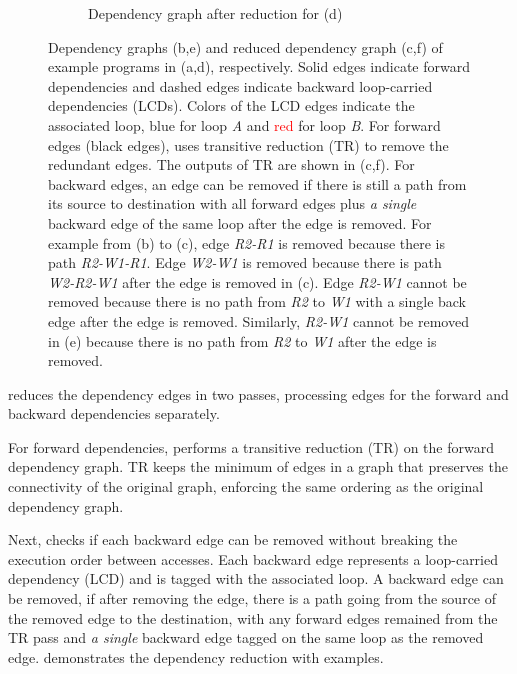 \begin{figure}
\begin{subfigure}[b]{0.3\textwidth}
\caption{
  Dependency graph after reduction for (d)
}
\end{subfigure}
\caption[Dependency graph reduction]{
  Dependency graphs (b,e) and reduced dependency graph (c,f) of example programs in (a,d),
  respectively.
  Solid edges indicate forward dependencies and
  dashed edges indicate backward loop-carried dependencies (LCDs).
  Colors of the LCD edges indicate the associated loop, \textcolor{pureblue}{blue} for loop \emph{A} and
  \textcolor{red}{red} for loop \emph{B}.
  For forward edges (black edges), \name uses transitive reduction (TR) to remove the redundant
  edges. The outputs of TR are shown in (c,f).
  For backward edges, an edge can be removed if there is still a path from its source to
  destination with all forward edges plus \emph{a single} backward edge of the same loop after the edge is
  removed.
  For example from (b) to (c), edge \emph{R2-R1} is removed because there is path \emph{R2-W1-R1}.
  Edge \emph{W2-W1} is removed because there is path \emph{W2-R2-W1} after the edge is removed in (c). 
  Edge \emph{R2-W1} cannot be removed because there is no path from \emph{R2} to \emph{W1} with a
  single back edge after the edge is removed.
  Similarly, \emph{R2-W1} cannot be
  removed in (e) because there is no path from \emph{R2} to \emph{W1} after the edge is removed.
}
\label{fig:graphred}
\end{figure}

\name reduces the dependency edges in two passes, processing edges for the forward and backward dependencies separately.

For forward dependencies, \name performs a transitive reduction (TR)\cite{tr} on the forward dependency
graph. TR keeps the minimum of edges in a graph that preserves the connectivity of the original
graph, enforcing the same ordering as the original dependency graph.

Next, \name checks if each backward edge can be removed without breaking the execution order between
accesses. 
Each backward edge represents a loop-carried dependency (LCD) and is tagged with the associated loop.
A backward edge can be removed, if after removing the edge, there is a path going from the source of the removed edge to the
destination, with any forward edges remained from the TR pass and 
\emph{a single} backward edge tagged on the same loop as the removed edge.
 demonstrates the dependency reduction with examples.

